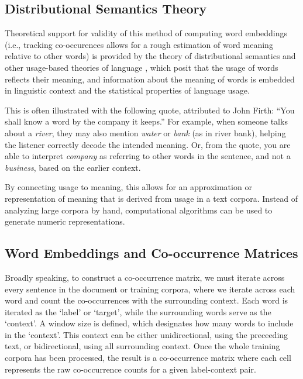  
\subsection{Distributional Semantics Theory}

Theoretical support for validity of this method of computing word embeddings (i.e., tracking co-occurences allows for a rough estimation of word meaning relative to other words) is provided by the theory of distributional semantics \cite{harris1954distributional, firth1957synopsis} and other usage-based theories of language \cite{wittgenstein1953philosophical}, which posit that the usage of words reflects their meaning, and information about the meaning of words is embedded in linguistic context and the statistical properties of language usage.

This is often illustrated with the following quote, attributed to John Firth: ``You shall know a word by the company it keeps.'' For example, when someone talks about a \textit{river}, they may also mention \textit{water} or \textit{bank} (as in river bank), helping the listener correctly decode the intended meaning. Or, from the quote, you are able to interpret \textit{company} as referring to other words in the sentence, and not a \textit{business}, based on the earlier context.

By connecting usage to meaning, this allows for an approximation or representation of meaning that is derived from usage in a text corpora. Instead of analyzing large corpora by hand, computational algorithms can be used to generate numeric representations.

\subsection{Word Embeddings and Co-occurrence Matrices}

Broadly speaking, to construct a co-occurrence matrix, we must iterate across every sentence in the document or training corpora, where we iterate across each word and count the co-occurrences with the surrounding context. Each word is iterated as the `label' or `target', while the surrounding words serve as the `context'. A window size is defined, which designates how many words to include in the `context'. This context can be either unidirectional, using the preceeding text, or bidirectional, using all surrounding context. Once the whole training corpora has been processed, the result is a co-occurrence matrix where each cell represents the raw co-occurrence counts for a given label-context pair.



